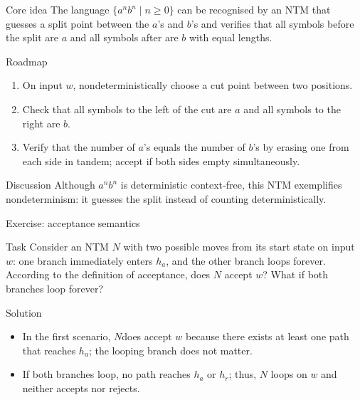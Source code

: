 \begin{frame}[t]{}
  \begin{tblock}{Core idea}
    The language $\{ a^n b^n \mid n \ge 0 \}$ can be recognised by an
    NTM that guesses a split point between the $a$’s and $b$’s and
    verifies that all symbols before the split are $a$ and all symbols
    after are $b$ with equal lengths.
  \end{tblock}
  \begin{tblock}{Roadmap}
    \begin{enumerate}
      \item On input $w$, nondeterministically choose a cut point
        between two positions.
      \item Check that all symbols to the left of the cut are $a$ and
        all symbols to the right are $b$.
      \item Verify that the number of $a$’s equals the number of $b$’s
        by erasing one from each side in tandem; accept if both sides
        empty simultaneously.
    \end{enumerate}
  \end{tblock}
  \begin{talert}{Discussion}
    Although $a^n b^n$ is deterministic context‑free, this NTM
    exemplifies nondeterminism: it guesses the split instead of
    counting deterministically.
  \end{talert}
  \label{fr:7.7-17}
\end{frame}

\begin{frame}[t]{Exercise: acceptance semantics}
  \begin{tblock}{Task}
    Consider an NTM $N$ with two possible moves from its start state
    on input $w$: one branch immediately enters $h_a$, and the other
    branch loops forever.  According to the definition of acceptance,
    does $N$ accept $w$?  What if both branches loop forever?
  \end{tblock}
  \begin{talert}{Solution}
    \begin{itemize}
      \item In the first scenario, $N$ ​
        does accept $w$ because there exists at least
        one path that reaches $h_a$; the looping branch does not
        matter.
      \item If both branches loop, no path reaches $h_a$ or $h_r$;
        thus, $N$ loops on $w$ and neither accepts nor rejects.
    \end{itemize}
  \end{talert}
  \label{fr:7.7-18}
\end{frame}

